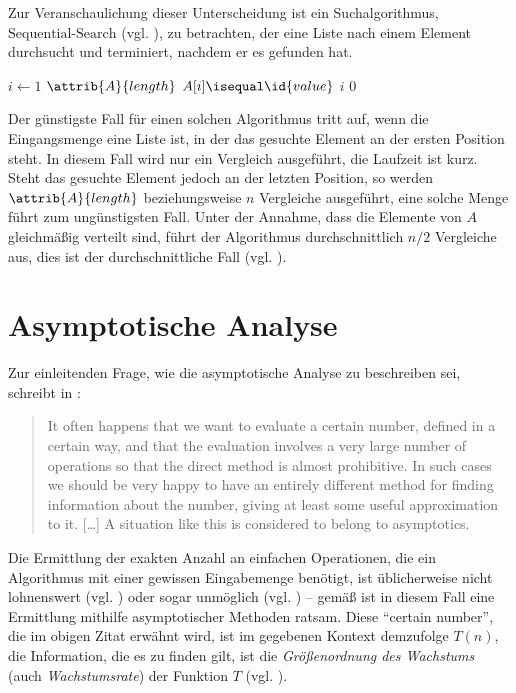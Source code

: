 Zur Veranschaulichung dieser Unterscheidung ist ein Suchalgorithmus, $\text{Sequential-Search}$ (vgl. \cite[396]{taocp3}), zu betrachten, der eine Liste nach einem Element durchsucht und terminiert, nachdem er es gefunden hat.

\begin{codebox}
    \li \For $i \gets 1$ \To $\attrib{A}{length}$
    \li     \Do
                \If $A[i] \isequal \id{value}$
    \li             \Then
                        \Return $i$
                    \End
            \End
    \li \Return $0$
\end{codebox}

Der günstigste Fall für einen solchen Algorithmus tritt auf, wenn die Eingangsmenge eine Liste ist, in der das gesuchte Element an der ersten Position steht. In diesem Fall wird nur ein Vergleich ausgeführt, die Laufzeit ist kurz. Steht das gesuchte Element jedoch an der letzten Position, so werden $\attrib{A}{length}$ beziehungsweise $n$ Vergleiche ausgeführt, eine solche Menge führt zum ungünstigsten Fall. Unter der Annahme, dass die Elemente von $A$ gleichmäßig verteilt sind, führt der Algorithmus durchschnittlich $n/2$ Vergleiche aus, dies ist der durchschnittliche Fall (vgl. \cite[59]{sha2011}).

\section{Asymptotische Analyse}
\label{sec:asymptotic-analysis}

Zur einleitenden Frage, wie die asymptotische Analyse zu beschreiben sei, schreibt \citeauthor{bru1958} in :

\blockquote[{\cite[1]{bru1958}}]{It often happens that we want to evaluate a certain number, defined in a certain way, and that the evaluation involves a very large number of operations so that the direct method is almost prohibitive. In such cases we should be very happy to have an entirely different method for finding information about the number, giving at least some useful approximation to it. [\ldots] A situation like this is considered to belong to asymptotics.}

Die Ermittlung der exakten Anzahl an einfachen Operationen, die ein Algorithmus mit einer gewissen Eingabemenge benötigt, ist üblicherweise nicht lohnenswert (vgl. \cite[28]{hsr1997}) oder sogar unmöglich (vgl. \cite[37]{meh1984}) -- gemäß \citeauthor{bru1958} ist in diesem Fall eine Ermittlung mithilfe asymptotischer Methoden ratsam. Diese \enquote{certain number}, die im obigen Zitat erwähnt wird, ist im gegebenen Kontext demzufolge $T(n)$, die Information, die es zu finden gilt, ist die \emph{Größenordnung des Wachstums} (auch \emph{Wachstumsrate}) der Funktion $T$ (vgl. \cite[63]{sha2011}).

